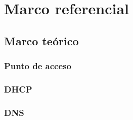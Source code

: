\section{Marco referencial}











\subsection{Marco teórico}

\subsubsection{Punto de acceso}
\subsubsection{DHCP}
\subsubsection{DNS}
